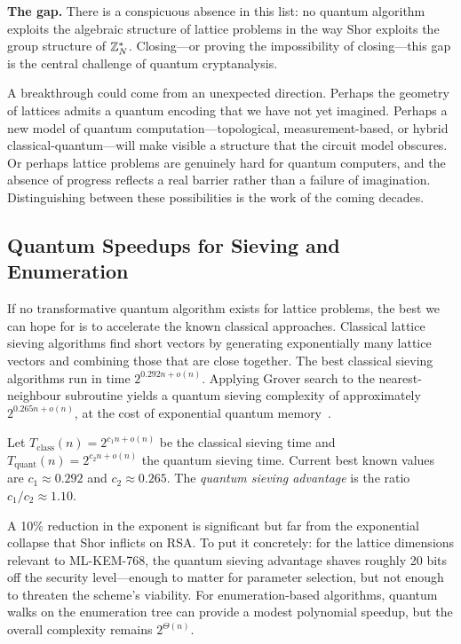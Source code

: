 \begin{svgraybox}
\textbf{The gap.}
There is a conspicuous absence in this list: no quantum algorithm exploits the algebraic structure of lattice problems in the way Shor exploits the group structure of $\mathbb{Z}_N^*$.  Closing---or proving the impossibility of closing---this gap is the central challenge of quantum cryptanalysis.
\end{svgraybox}

A breakthrough could come from an unexpected direction.  Perhaps the geometry of lattices admits a quantum encoding that we have not yet imagined.  Perhaps a new model of quantum computation---topological, measurement-based, or hybrid classical-quantum---will make visible a structure that the circuit model obscures.  Or perhaps lattice problems are genuinely hard for quantum computers, and the absence of progress reflects a real barrier rather than a failure of imagination.  Distinguishing between these possibilities is the work of the coming decades.

\subsection{Quantum Speedups for Sieving and Enumeration}
\label{subsec:quantum-sieving}

If no transformative quantum algorithm exists for lattice problems, the best we can hope for is to accelerate the known classical approaches.  Classical lattice sieving algorithms find short vectors by generating exponentially many lattice vectors and combining those that are close together.  The best classical sieving algorithms run in time $2^{0.292n + o(n)}$.  Applying Grover search to the nearest-neighbour subroutine yields a quantum sieving complexity of approximately $2^{0.265n + o(n)}$, at the cost of exponential quantum memory~\cite{Laarhoven2015}.

\begin{definition}
\label{def:quantum-sieving}
Let $T_{\mathrm{class}}(n) = 2^{c_1 n + o(n)}$ be the classical sieving time and $T_{\mathrm{quant}}(n) = 2^{c_2 n + o(n)}$ the quantum sieving time.  Current best known values are $c_1 \approx 0.292$ and $c_2 \approx 0.265$.  The \emph{quantum sieving advantage} is the ratio $c_1 / c_2 \approx 1.10$.
\end{definition}

A 10\% reduction in the exponent is significant but far from the exponential collapse that Shor inflicts on RSA.  To put it concretely: for the lattice dimensions relevant to ML-KEM-768, the quantum sieving advantage shaves roughly 20 bits off the security level---enough to matter for parameter selection, but not enough to threaten the scheme's viability.  For enumeration-based algorithms, quantum walks on the enumeration tree can provide a modest polynomial speedup, but the overall complexity remains $2^{\Theta(n)}$.

